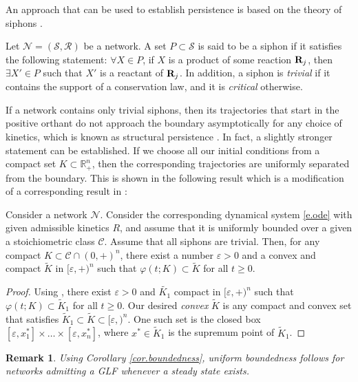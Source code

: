 \documentclass[onefignum,onetabnum]{siamonline220329}
\newcommand{\R}{{\rm \bf R}}
\newcommand{\Rs}{{\mathscr R}}
\newcommand{\Ss}{{\mathscr S}}
\newcommand{\Ns}{{\mathscr N}}
\newcommand{\Cs}{\mathscr C}
\newcommand\ve{\varepsilon}
\newcommand{\wt}{\widetilde}
\newtheorem{remark}{Remark}%
\def\infty{}%
\begin{document}
{An approach that can be used to establish persistence is based on the theory of siphons \cite{angeli07p}. 

\begin{definition} \label{d.trivialSiphon} Let $\Ns=(\Ss,\Rs)$ be a network. A set $P\subset\mathscr S$ is said to be a siphon if {it} satisfies the following statement:
	$\forall X \in P$, if $X$ is a product of some reaction $\R_j$, then $\exists X'\in P$ such that $X'$ is a reactant of $\R_j$. In addition,
	a siphon is \emph{trivial} if it contains {the} support of a conservation law, and it is \textit{critical} otherwise.
\end{definition}



If a network contains only trivial siphons, then its trajectories that start in the positive orthant do not approach the boundary asymptotically for any choice of kinetics, which is known as structural persistence \cite{angeli07p}. In fact, a slightly stronger statement can be established. If we choose all our initial conditions from a compact set $K\subset \mathbb R_+^n$, then the corresponding trajectories are uniformly separated from the boundary. This is shown in the following result which is a modification of a corresponding result in \cite{MA_TAC22}:
\begin{lemma}
	\label{eventuallyK}
	Consider a network $\Ns$. Consider the corresponding dynamical system \eqref{e.ode} with given admissible kinetics $R$, and assume that it is uniformly bounded over a given a stoichiometric class $\Cs$. 
	Assume that all siphons are trivial.
	Then, 
	for any compact $K \subset \Cs \cap (0,+\infty)^n$, there exist a number $\ve>0$ and
	a convex and compact $\tilde{K}$  in $[\ve,+ \infty)^n$ such that
	$\varphi (t;K) {\subset} \tilde{K}$ for all $t \geq 0$.  
\end{lemma}
\begin{proof}
	Using \cite[Lemma 5]{MA_TAC22},  there exist $\ve>0$ and
	$\tilde{K_1}$ compact in $[\ve,+ \infty)^n$ such that
	$\varphi (t;K) {\subset} \tilde{K}_1$ for all $t \geq 0$.
	Our desired \emph{convex} $\wt K$ is any compact and convex set that satisfies $\wt K_1\subset \wt K \subset [\ve,\infty)^n$. One such set is the closed box $[\ve,x_1^*]\times \dots \times [\ve,x_n^*]$, where $x^* \in\wt K_1$ is the supremum point of $\wt K_1$.
\end{proof}

\begin{remark}
	Using Corollary \ref{cor.boundedness}, uniform boundedness follows for networks admitting a GLF whenever a steady state exists.
\end{remark}

}
\end{document}
